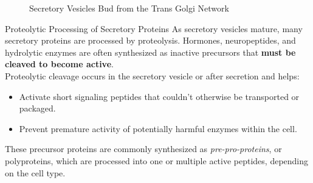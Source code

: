 \documentclass[../main.tex]{subfiles}
\begin{document}
\begin{figure}[H]
	\centering
	\caption{Secretory Vesicles Bud from the Trans Golgi Network}
\end{figure}

\begin{RemarkWithTitel}{Proteolytic Processing of Secretory Proteins}
	As secretory vesicles mature, many secretory proteins are processed by proteolysis. Hormones, neuropeptides, and hydrolytic enzymes are often synthesized as inactive precursors that \textbf{must be cleaved to become active}.\\
	\indent Proteolytic cleavage occurs in the secretory vesicle or after secretion and helps:
	\begin{itemize}
		\item Activate short signaling peptides that couldn't otherwise be transported or packaged.
		\item Prevent premature activity of potentially harmful enzymes within the cell.
	\end{itemize}
	These precursor proteins are commonly synthesized as \textit{pre-pro-proteins}, or polyproteins, which are processed into one or multiple active peptides, depending on the cell type.
\end{RemarkWithTitel}
\end{document}

